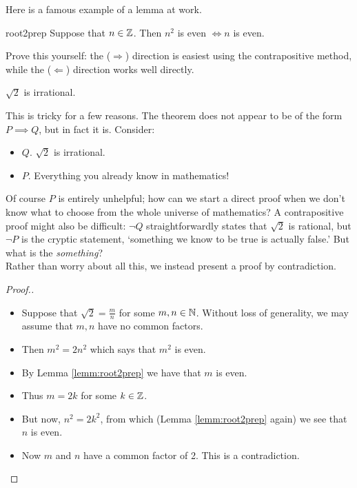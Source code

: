  Here is a famous example of a lemma at work.

\begin{lemm}{}{root2prep}
Suppose that $n\in\mathbb{Z}$. Then $n^2$ is even $\iff n$ is even.
\end{lemm}

 Prove this yourself: the ($\Rightarrow$) direction is easiest using the contrapositive method, while the ($\Leftarrow$) direction works well directly.

\begin{thm}{}{}
$\sqrt 2$ is irrational.
\end{thm}

 This is tricky for a few reasons. The theorem does not appear to be of the form $P\implies Q$, but in fact it is. Consider:
\begin{itemize}\setlength{\itemsep}{0pt}
  \item[]{$Q$.} $\sqrt 2$ is irrational.
  \item[]{$P$.} Everything you already know in mathematics!
\end{itemize}
Of course $P$ is entirely unhelpful; how can we start a direct proof when we don't know what to choose from the whole universe of mathematics? A contrapositive proof might also be difficult: $\neg Q$ straightforwardly states that $\sqrt 2$ is rational, but $\neg P$ is the cryptic statement, `something we know to be true is actually false.' But what is the \emph{something}?\\
Rather than worry about all this, we instead present a proof by contradiction.

\begin{proof}[Proof.\hspace{-27pt}]
\begin{itemize}\setlength{\itemsep}{-2pt}
  \item[] Suppose that $\sqrt 2=\frac mn$ for some $m,n\in\mathbb{N}$. Without loss of generality, we may assume that $m,n$ have no common factors.
  \item[] Then $m^2=2n^2$ which says that $m^2$ is even.
  \item[] By Lemma \ref{lemm:root2prep} we have that $m$ is even.
  \item[] Thus $m=2k$ for some $k\in\mathbb{Z}$.
	\item[] But now, $n^2=2k^2$, from which (Lemma \ref{lemm:root2prep} again) we see that $n$ is even.
	\item[] Now $m$ and $n$ have a common factor of 2. This is a contradiction.\qedhere
\end{itemize}
\end{proof}


